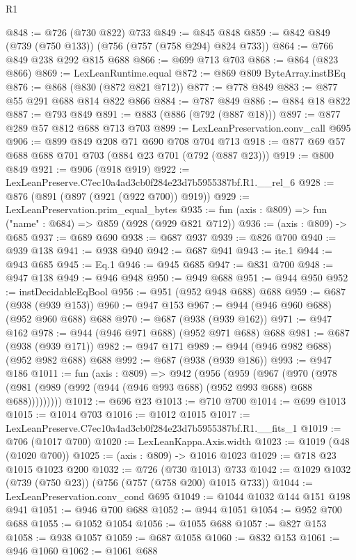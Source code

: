 \begin{lexlean}{R1}
\begin{coremodule}
@848 := @726 (@730 @822) @733
@849 := @845 @848
@859 := @842 @849 (@739 (@750 @133)) (@756 (@757 (@758 @294) @824 @733))
@864 := @766 @849 @238 @292 @815 @688
@866 := @699 @713 @703
@868 := @864 (@823 @866)
@869 := LexLeanRuntime.equal
@872 := @869 @809 ByteArray.instBEq
@876 := @868 (@830 (@872 @821 @712))
@877 := @778 @849
@883 := @877 @55 @291 @688 @814 @822 @866
@884 := @787 @849
@886 := @884 @18 @822
@887 := @793 @849
@891 := @883 (@886 (@792 (@887 @18)))
@897 := @877 @289 @57 @812 @688 @713 @703
@899 := LexLeanPreservation.conv_call @695
@906 := @899 @849 @208 @71 @690 @708 @704 @713
@918 := @877 @69 @57 @688 @688 @701 @703 (@884 @23 @701 (@792 (@887 @23)))
@919 := @800 @849
@921 := @906 (@918 @919)
@922 := LexLeanPreserve.C7ec10a4ad3cb0f284e23d7b5955387bf.R1.__rel_6
@928 := @876 (@891 (@897 (@921 (@922 @700)) @919))
@929 := LexLeanPreservation.prim_equal_bytes
@935 := fun (axis : @809) => fun ("name" : @684) => @859 (@928 (@929 @821 @712))
@936 := (axis : @809) -> @685
@937 := @689 @690
@938 := @687 @937
@939 := @826 @700
@940 := @939 @138
@941 := @938 @940
@942 := @687 @941
@943 := ite.{1}
@944 := @943 @685
@945 := Eq.{1}
@946 := @945 @685
@947 := @831 @700
@948 := @947 @138
@949 := @946 @948
@950 := @949 @688
@951 := @944 @950
@952 := instDecidableEqBool
@956 := @951 (@952 @948 @688) @688
@959 := @687 (@938 (@939 @153))
@960 := @947 @153
@967 := @944 (@946 @960 @688) (@952 @960 @688) @688
@970 := @687 (@938 (@939 @162))
@971 := @947 @162
@978 := @944 (@946 @971 @688) (@952 @971 @688) @688
@981 := @687 (@938 (@939 @171))
@982 := @947 @171
@989 := @944 (@946 @982 @688) (@952 @982 @688) @688
@992 := @687 (@938 (@939 @186))
@993 := @947 @186
@1011 := fun (axis : @809) =>
  @942
    (@956
      (@959
        (@967
          (@970 (@978 (@981 (@989 (@992 (@944 (@946 @993 @688) (@952 @993 @688) @688 @688)))))))))
@1012 := @696 @23
@1013 := @710 @700
@1014 := @699 @1013
@1015 := @1014 @703
@1016 := @1012 @1015
@1017 := LexLeanPreserve.C7ec10a4ad3cb0f284e23d7b5955387bf.R1.__fits_1
@1019 := @706 (@1017 @700)
@1020 := LexLeanKappa.Axis.width
@1023 := @1019 (@48 (@1020 @700))
@1025 := (axis : @809) -> @1016 @1023
@1029 := @718 @23 @1015 @1023 @200
@1032 := @726 (@730 @1013) @733
@1042 := @1029 @1032 (@739 (@750 @23)) (@756 (@757 (@758 @200) @1015 @733))
@1044 := LexLeanPreservation.conv_cond @695
@1049 := @1044 @1032 @144 @151 @198 @941
@1051 := @946 @700 @688
@1052 := @944 @1051
@1054 := @952 @700 @688
@1055 := @1052 @1054
@1056 := @1055 @688
@1057 := @827 @153
@1058 := @938 @1057
@1059 := @687 @1058
@1060 := @832 @153
@1061 := @946 @1060
@1062 := @1061 @688

\end{coremodule}
\end{lexlean}
